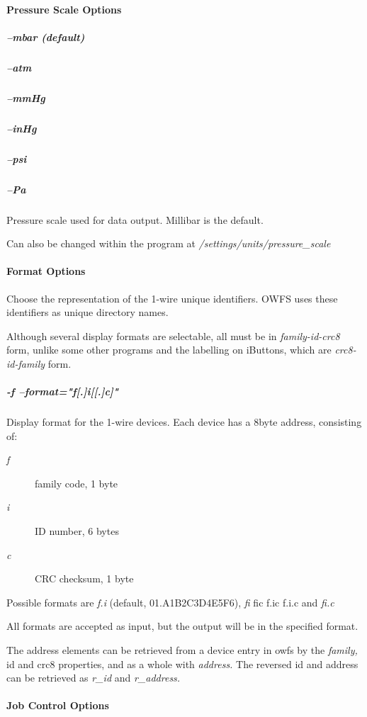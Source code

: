 \paragraph*{Pressure Scale Options}

\subparagraph*{--mbar (default)}
\subparagraph*{--atm}
\subparagraph*{--mmHg}
\subparagraph*{--inHg}
\subparagraph*{--psi}
\subparagraph*{--Pa}Pressure
scale used for data output. Millibar is the default. 

Can also be changed
within the program at \textit{/settings/units/pressure\_scale}             
\paragraph*{Format
Options}
Choose the representation of the 1-wire unique identifiers. OWFS uses
these identifiers as unique directory names. 

Although several display formats
are selectable, all must be in  \textit{family-id-crc8} form, unlike some other programs
and the labelling on iButtons, which are \textit{crc8-id-family} form. 
\subparagraph*{-f --format="f[.]i[[.]c]"}Display
format for the 1-wire devices. Each device has a 8byte address, consisting
of: \begin{description}
\item [\textit{f} ] family code, 1 byte 
\item [\textit{i} ] ID number, 6 bytes 
\item [\textit{c} ] CRC checksum, 1 byte 
\end{description}


Possible
formats are \textit{f.i} (default, 01.A1B2C3D4E5F6), \textit{fi} fic f.ic f.i.c and \textit{fi.c} 

All formats
are accepted as input, but the output will be in the specified format. 

The
address elements can be retrieved from a device entry in owfs by the  \textit{family,}
id and crc8 properties, and as a whole with \textit{address.} The reversed id and
address can be retrieved as \textit{r\_id} and  \textit{r\_address.}            
\paragraph*{Job Control
Options}

